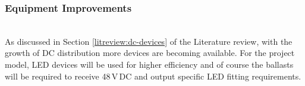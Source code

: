 \subsubsection{Equipment Improvements}

~\\
As discussed in Section \ref{litreview:dc-devices} of the Literature review, with the growth of DC distribution more devices are becoming available. For the project model, LED devices will be used for higher efficiency and of course the ballasts will be required to receive 48\,V\,DC and output specific LED fitting requirements.  

